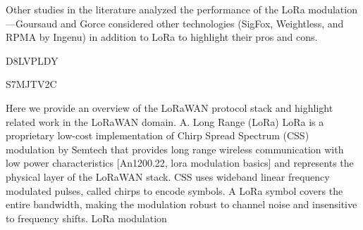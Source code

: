 



Other studies in the literature analyzed the performance of the LoRa modulation—Goursaud and Gorce \cite{goursaud_dedicated_2015} considered other technologies (SigFox,
	Weightless,
	and RPMA by Ingenu) in addition to LoRa to highlight their pros and cons.


\cite{zorbas_improving_2018} D8LVPLDY




\cite{abdelfadeel_fair_2018} S7MJTV2C

Here we provide an overview of the LoRaWAN protocol stack and highlight related work in the LoRaWAN domain.
A.
Long Range (LoRa) LoRa is a proprietary low-cost implementation of Chirp Spread Spectrum (CSS) modulation by Semtech that provides long range wireless communication with low power characteristics [An1200.22,
	lora modulation basics] and represents the physical layer of the LoRaWAN stack.
CSS uses wideband linear frequency modulated pulses,
	called chirps to encode symbols.
A LoRa symbol covers the entire bandwidth,
	making the modulation robust to channel noise and insensitive to frequency shifts.
LoRa modulation

